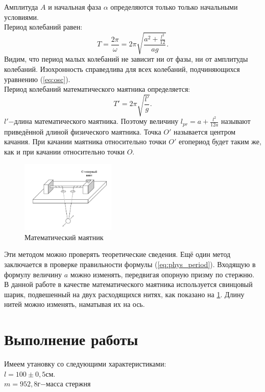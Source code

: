 \documentclass[13pt,a4paper]{article}
\begin{document}
Амплитуда $A$ и начальная фаза $\alpha$ определяются только только начальными условиями.\\
Период колебаний равен:
\begin{equation}
	T=\frac{2\pi}{\omega}=2\pi\sqrt{\frac{a^2+\frac{l^2}{12}}{ag}}.
	\label{eq:phys_period}
\end{equation}
Видим, что период малых колебаний не зависит ни от фазы, ни от амплитуды колебаний. Изохронность справедлива для всех колебаний, подчиняющихся уравнению (\ref{eq:osc}).\\
Период колебаний математического маятника определяется:
\begin{equation}
	T'=2\pi\sqrt{\frac{l'}{g}}.
	\label{eq:math_period}
\end{equation}
$l'$$-$длина математического маятника. Поэтому величину $l_{pr}=a+\frac{l^2}{12a}$ называют приведённой длиной физического маятника. Точка $O'$ называется центром качания. При качании маятника относительно точки $O'$ егопериод будет таким же, как и при качании относительно точки $O$.  
\begin{figure}
   		\includegraphics[width=0.4\textwidth]{mathpend}
    	\caption{Математический маятник}
    	\label{ris:mathpend}
\end{figure}
\newpage
Эти методом можно проверять теоретические сведения. Ещё один метод заключается в проверке правильности формулы (\ref{eq:phys_period}). Входящую в формулу величину $a$ можно изменять, передвигая опорную призму по стержню. В данной работе в качестве математического маятника используется свинцовый шарик, подвешенный на двух расходящихся нитях, как показано на \ref{ris:mathpend}. Длину нитей можно изменять, наматывая их на ось.
\newpage


\section{Выполнение работы}

Имеем утановку со следующими характеристиками:\\
$l=100\pm0,5$см.\\
$m=952,8$г$-$масса стержня
\end{document}
